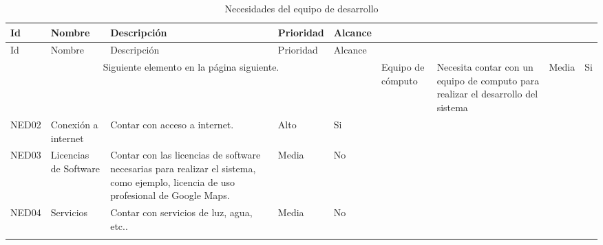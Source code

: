 \begin{longtable}{|m{1.5cm}|m{3cm}|m{5cm}|m{2cm}| m{2cm}|}
        \rowcolor[HTML]{3531FF} 
        {\color[HTML]{FFFFFF} Id} &{\color[HTML]{FFFFFF}Nombre} & {\color[HTML]{FFFFFF} Descripción} & {\color[HTML]{FFFFFF}Prioridad} & {\color[HTML]{FFFFFF}Alcance}\\
        \hline
        \endfirsthead
        \hline
        \rowcolor[HTML]{3531FF} 
        {\color[HTML]{FFFFFF} Id} &{\color[HTML]{FFFFFF}Nombre} & {\color[HTML]{FFFFFF} Descripción} & {\color[HTML]{FFFFFF}Prioridad} & {\color[HTML]{FFFFFF}Alcance}\\
        \hline 
        \endhead
        \multicolumn{5}{c}{Siguiente elemento en la página siguiente.}
        \endfoot
        \endlastfoot
        
        NED01 & Equipo de cómputo & Necesita contar con un equipo de computo para realizar el desarrollo del sistema & Media & Si \\ \hline
        NED02 & Conexión a internet & Contar con acceso a internet. & Alto & Si \\ \hline
        NED03 & Licencias de Software & Contar con las licencias de software necesarias para realizar el sistema, como ejemplo, licencia de uso profesional de Google Maps. & Media & No \\ \hline
        NED04 & Servicios & Contar con servicios de luz, agua, etc.. & Media & No \\ \hline
    \caption{Necesidades del equipo de desarrollo}
    \label{tab:NEDs}
\end{longtable}


